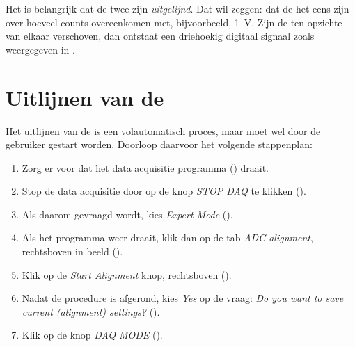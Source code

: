 \begin{figure}
\centering
{}
\caption{}
\label{fig:ADC-sampling}
\end{figure}

Het is belangrijk dat de twee \adcs zijn \emph{uitgelijnd}.  Dat wil
zeggen: dat de \adcs het eens zijn over hoeveel \adc counts overeenkomen
met, bijvoorbeeld, \SI{1}{\volt}.  Zijn de \adcs ten opzichte van elkaar
verschoven, dan ontstaat een driehoekig digitaal signaal zoals weergegeven
in .

\begin{figure}
\centering
{}
\caption{}
\label{fig:unaligned-adcs}
\end{figure}


\section{Uitlijnen van de \adcs}

Het uitlijnen van de \adcs is een volautomatisch proces, maar moet wel
door de gebruiker gestart worden.  Doorloop daarvoor het volgende
stappenplan:
\begin{enumerate}
\item Zorg er voor dat het data acquisitie programma (\daq) draait.
\item Stop de data acquisitie door op de knop \emph{STOP DAQ} te klikken
().
\item Als daarom gevraagd wordt, kies \emph{Expert Mode}
().
\item Als het programma weer draait, klik dan op de tab \emph{ADC
alignment}, rechtsboven in beeld ().
\item Klik op de \emph{Start Alignment} knop, rechtsboven
().
\item Nadat de procedure is afgerond, kies \emph{Yes} op de vraag:
\emph{Do you want to save current (alignment) settings?}
().
\item Klik op de knop \emph{DAQ MODE} ().
\end{enumerate}

